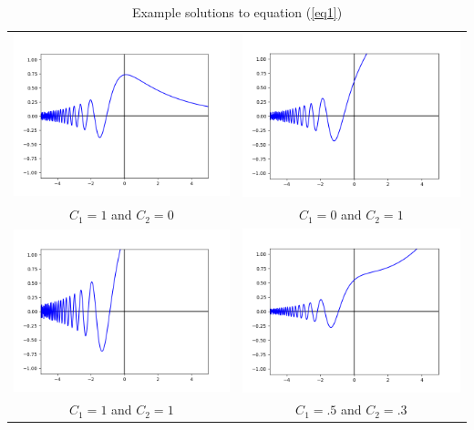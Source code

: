 \documentclass[12pt]{article}
\begin{document}
	\begin{table}
		\centering
		\begin{tabular}{cc}
			\includegraphics[width=.5\textwidth]{hw3_figure_1} & \includegraphics[width=.5\textwidth]{hw3_figure_2} \\
			$C_1=1$ and $C_2=0$ & $C_1=0$ and $C_2=1$ \\
			\includegraphics[width=.5\textwidth]{hw3_figure_3} & \includegraphics[width=.5\textwidth]{hw3_figure_4} \\
			$C_1=1$ and $C_2=1$ & $C_1=.5$ and $C_2=.3$ \\
		\end{tabular}
		\caption{Example solutions to equation (\ref{eq1})}
		\label{tbl:table_of_figures}
	\end{table} 
	
\end{document}
